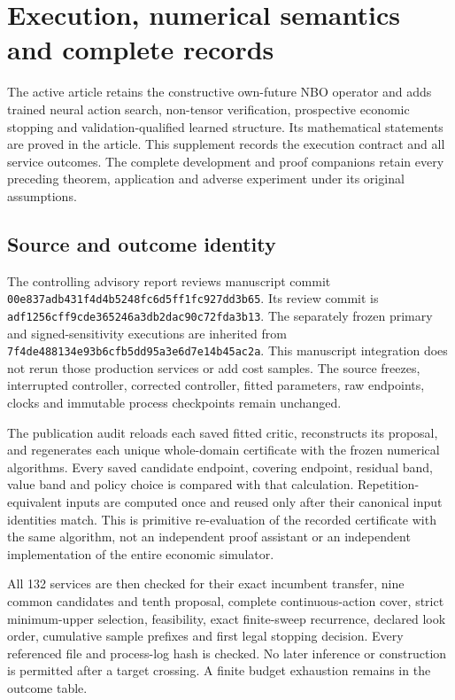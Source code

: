 \section{Execution, numerical semantics and complete records}\label{supp:execution56}
The active article retains the constructive own-future NBO operator and adds trained neural action search, non-tensor verification, prospective economic stopping and validation-qualified learned structure. Its mathematical statements are proved in the article. This supplement records the execution contract and all service outcomes. The complete development and proof companions retain every preceding theorem, application and adverse experiment under its original assumptions.

\subsection{Source and outcome identity}
The controlling advisory report reviews manuscript commit \nolinkurl{00e837adb431f4d4b5248fc6d5ff1fc927dd3b65}. Its review commit is \nolinkurl{adf1256cff9cde365246a3db2dac90c72fda3b13}. The separately frozen primary and signed-sensitivity executions are inherited from \nolinkurl{7f4de488134e93b6cfb5dd95a3e6d7e14b45ac2a}. This manuscript integration does not rerun those production services or add cost samples. The source freezes, interrupted controller, corrected controller, fitted parameters, raw endpoints, clocks and immutable process checkpoints remain unchanged.

The publication audit reloads each saved fitted critic, reconstructs its proposal, and regenerates each unique whole-domain certificate with the frozen numerical algorithms. Every saved candidate endpoint, covering endpoint, residual band, value band and policy choice is compared with that calculation. Repetition-equivalent inputs are computed once and reused only after their canonical input identities match. This is primitive re-evaluation of the recorded certificate with the same algorithm, not an independent proof assistant or an independent implementation of the entire economic simulator.

All 132 services are then checked for their exact incumbent transfer, nine common candidates and tenth proposal, complete continuous-action cover, strict minimum-upper selection, feasibility, exact finite-sweep recurrence, declared look order, cumulative sample prefixes and first legal stopping decision. Every referenced file and process-log hash is checked. No later inference or construction is permitted after a target crossing. A finite budget exhaustion remains in the outcome table.

